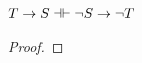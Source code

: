\begin{small}
\begin{earg}

\end{earg}


\problempart

\begin{earg}
\item $T\rightarrow S \dashv\vdash {\neg} S \rightarrow {\neg} T$
\begin{proof}
 \pr{}
\open
	 \as{}
		\open
		 \as{}
		 
		 
		\close
	 
\close
{}
\end{proof}


\end{earg}
\end{small}

